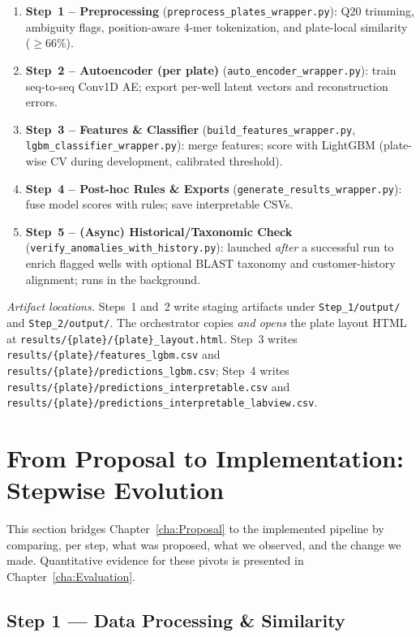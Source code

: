 \begin{enumerate}
  \item \textbf{Step~1 -- Preprocessing} (\texttt{preprocess\_plates\_wrapper.py}): Q20 trimming, ambiguity flags, position-aware 4-mer tokenization, and plate-local similarity ($\geq$66\%).
  \item \textbf{Step~2 -- Autoencoder (per plate)} (\texttt{auto\_encoder\_wrapper.py}): train seq-to-seq Conv1D AE; export per-well latent vectors and reconstruction errors.
  \item \textbf{Step~3 -- Features \& Classifier} (\texttt{build\_features\_wrapper.py}, \texttt{lgbm\_classifier\_wrapper.py}): merge features; score with LightGBM (plate-wise CV during development, calibrated threshold).
  \item \textbf{Step~4 -- Post-hoc Rules \& Exports} (\texttt{generate\_results\_wrapper.py}): fuse model scores with rules; save interpretable CSVs.
  \item \textbf{Step~5 -- (Async) Historical/Taxonomic Check} (\texttt{verify\_anomalies\_with\_history.py}): launched \emph{after} a successful run to enrich flagged wells with optional BLAST taxonomy and customer-history alignment; runs in the background.
\end{enumerate}

\noindent\textit{Artifact locations.} Steps~1 and~2 write staging artifacts under \texttt{Step\_1/output/} and \texttt{Step\_2/output/}. The orchestrator copies \emph{and opens} the plate layout HTML at \texttt{results/\{plate\}/\{plate\}\_layout.html}. Step~3 writes \texttt{results/\{plate\}/features\_lgbm.csv} and \texttt{results/\{plate\}/predictions\_lgbm.csv}; Step~4 writes \texttt{results/\{plate\}/predictions\_interpretable.csv} and \texttt{results/\{plate\}/predictions\_interpretable\_labview.csv}.

\section{From Proposal to Implementation: Stepwise Evolution}
\label{sec:stepwise_evolution}

This section bridges Chapter~\ref{cha:Proposal} to the implemented pipeline by comparing, per step, what was proposed, what we observed, and the change we made. Quantitative evidence for these pivots is presented in Chapter~\ref{cha:Evaluation}.


\subsection*{Step 1 — Data Processing \& Similarity}
